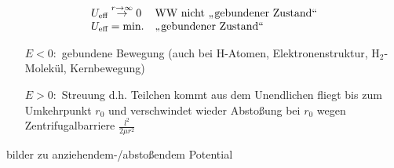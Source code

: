 \documentclass[titlepage,12pt,a4paper,ngerman]{report}
\newcommand{\tx}[1]{\textrm{#1}}
\begin{document}
\begin{itemize}
$$\begin{array}{ll}
	U_{\tx{eff}} \buildrel r \rightarrow \infty \over \rightarrow 0 & \tx{WW nicht ,,gebundener Zustand``} \\
	U_{\tx{eff}} = \tx{min.} & \tx{,,gebundener Zustand``}
	\end{array}$$
	\begin{itemize}
		\item[$ E<0: $] gebundene Bewegung (auch bei H-Atomen, Elektronenstruktur, $ \tx{H}_2 $-Molekül, Kernbewegung)
		\item[$ E>0: $] Streuung d.h. Teilchen kommt aus dem Unendlichen fliegt bis zum Umkehrpunkt $ r_0 $ und verschwindet wieder Abstoßung bei $ r_0 $ wegen Zentrifugalbarriere $ \frac{l^2}{2 \mu r^2} $
	\end{itemize}
	
	bilder zu anziehendem-/abstoßendem Potential
\end{itemize}
\end{document}
